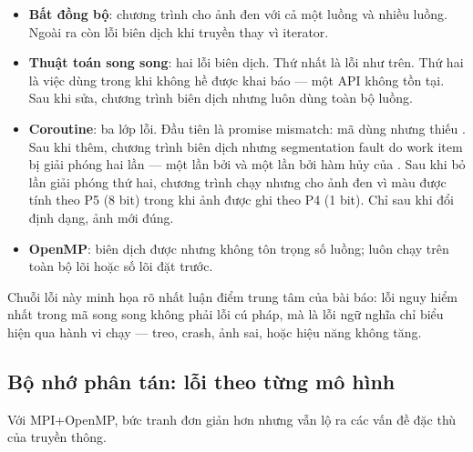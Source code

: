 \begin{itemize}
  \item \textbf{Bất đồng bộ}: chương trình cho ảnh đen với cả một luồng và nhiều
        luồng. Ngoài ra còn lỗi biên dịch  khi truyền
         thay vì iterator.
  \item \textbf{Thuật toán song song}: hai lỗi biên dịch. Thứ nhất là lỗi
         như trên. Thứ hai là việc dùng
         trong khi
         không hề được khai báo — một API không tồn
        tại. Sau khi sửa, chương trình biên dịch nhưng luôn dùng toàn bộ luồng.
  \item \textbf{Coroutine}: ba lớp lỗi. Đầu tiên là promise mismatch: mã dùng
         nhưng  thiếu
        . Sau khi thêm, chương trình biên dịch nhưng
        segmentation fault do work item bị giải phóng hai lần — một lần bởi
         và một lần bởi hàm hủy của . Sau khi bỏ
        lần giải phóng thứ hai, chương trình chạy nhưng cho ảnh đen vì màu được
        tính theo P5 (8 bit) trong khi ảnh được ghi theo P4 (1 bit). Chỉ sau khi
        đổi định dạng, ảnh mới đúng.
  \item \textbf{OpenMP}: biên dịch được nhưng không tôn trọng số luồng; luôn chạy
        trên toàn bộ lõi hoặc số lõi đặt trước.
\end{itemize}

Chuỗi lỗi này minh họa rõ nhất luận điểm trung tâm của bài báo: lỗi nguy hiểm
nhất trong mã song song không phải lỗi cú pháp, mà là lỗi ngữ nghĩa chỉ biểu hiện
qua hành vi chạy — treo, crash, ảnh sai, hoặc hiệu năng không tăng.

\subsection{Bộ nhớ phân tán: lỗi theo từng mô hình}

Với MPI+OpenMP, bức tranh đơn giản hơn nhưng vẫn lộ ra các vấn đề đặc thù của
truyền thông.

